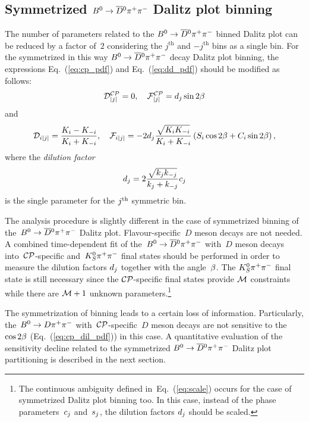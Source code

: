 \documentclass[a4paper,11pt]{article}
\begin{document}
\subsection{Symmetrized \texorpdfstring{$B^0\to\overline{D}{}^0\pi^+\pi^-$}{B0 -> anti-D0 pi+ pi-} 
Dalitz plot binning}\label{sec:symm_dp}
The number of parameters related to the $B^0\to\overline{D}{}^0\pi^+\pi^-$ binned Dalitz plot can be 
reduced by a factor of~$2$ considering the $j^{\mathrm{th}}$ and 
$-j^{\mathrm{th}}$ bins as a single bin.  For the symmetrized in this way 
$B^0\to\overline{D}{}^0\pi^+\pi^-$ decay Dalitz plot binning, the expressions Eq.~(\ref{eq:cp_pdf}) and 
Eq.~(\ref{eq:dd_pdf}) should be modified as follows:
\begin{equation}\label{eq:cp_dil_pdf}
 \mathcal{D}^{\mathcal{CP}}_{|j|} = 0,\quad \mathcal{F}^{\mathcal{CP}}_{|j|} = d_j\sin{2\beta}
\end{equation}
and
\begin{equation}\label{eq:dd_dil_pdf}
 \mathcal{D}_{i|j|} = \frac{K_i-K_{-i}}{K_i+K_{-i}},\quad
 \mathcal{F}_{i|j|} =-2d_j\frac{\sqrt{K_iK_{-i}}}{K_i+K_{-i}}
               \left(S_i\cos{2\beta}+C_i\sin{2\beta}\right),
\end{equation}
where the \emph{dilution factor}
\begin{equation}\label{eq:dilut}
 d_j = 2\frac{\sqrt{k_jk_{-j}}}{k_j+k_{-j}}c_j
\end{equation}
is the single parameter for the $j{^{\mathrm{th}}}$ symmetric bin.

The analysis procedure is slightly different in the case of symmetrized binning 
of the~$B^0\to\overline{D}{}^0\pi^+\pi^-$ Dalitz plot.  Flavour-specific~$D$ meson decays are not 
needed.  A combined time-dependent fit of the~$B^0\to\overline{D}{}^0\pi^+\pi^-$ with~$D$ meson decays 
into~$\mathcal{CP}$-specific and~$K_S^0\pi^+\pi^-$ final states should be performed in order 
to measure the dilution factors $d_j$ 
together with the angle~$\beta$.  The $K_S^0\pi^+\pi^-$ final state is still necessary 
since the $\mathcal{CP}$-specific final states provide $\mathcal{M}$ constraints 
while there are $\mathcal{M}+1$ unknown parameters.\footnote{
The continuous ambiguity defined in~Eq.~(\ref{eq:scale}) occurs for the case of 
symmetrized Dalitz plot binning too.  In this case, instead of the phase 
parameters~$c_j$ and~$s_j$, the dilution factors $d_j$ should be scaled.} 

The symmetrization of binning leads to a certain loss of information.  
Particularly, the~$B^0\to D\pi^+\pi^-$ with~$\mathcal{CP}$-specific~$D$ meson decays are not 
sensitive to the~$\cos{2\beta}$ (Eq.~(\ref{eq:cp_dil_pdf})) in this 
case.  A quantitative evaluation of the sensitivity decline related 
to the symmetrized $B^0\to\overline{D}{}^0\pi^+\pi^-$ Dalitz plot partitioning is described in 
the next section.
\end{document}
